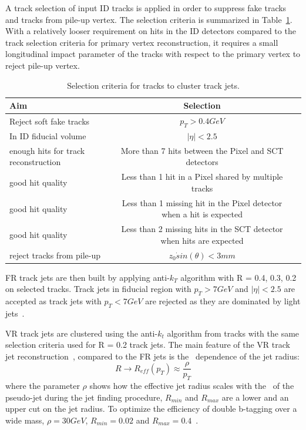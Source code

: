 \par A track selection of input ID tracks is applied in order to suppress fake tracks and tracks from pile-up vertex. The selection criteria is summarized in Table~\ref{tab:trk}. With a relatively looser requirement on hits in the ID detectors compared to the track selection criteria for primary vertex reconstruction, it requires a small longitudinal impact parameter of the tracks with respect to the primary vertex to reject pile-up vertex.
\begin{table}	
\centering

    \scriptsize
\begin{tabular}{|l|c|c}
\hline
Aim & Selection \\					
\hline
Reject soft fake tracks &$p_T> 0.4 GeV$ \\
\hline
In ID fiducial volume &$|\eta| < 2.5$\\
\hline 
enough hits for track reconstruction & More than 7 hits between the Pixel and SCT detectors \\
\hline 
 good hit quality& Less than 1 hit in a Pixel shared by multiple tracks\\
\hline
 good hit quality&Less than 1 missing hit in the Pixel detector when a hit is expected\\
\hline 
good hit quality&Less than 2 missing hits in the SCT detector when hits are expected\\
 \hline
reject tracks from pile-up & $z_0 \dot sin(\theta) < 3 mm$\\
 \hline
\end{tabular}
\caption{Selection criteria for tracks to cluster track jets. }
\label{tab:trk}
\end{table}	
\par FR track jets are then built by applying anti-$k_T$ algorithm with R = {0.4, 0.3, 0.2} on selected tracks. Track jets in fiducial region with $p_T > 7 GeV$ and $|\eta| < 2.5$ are accepted as track jets with $p_T < 7 GeV$ are rejected as they are dominated by light jets~\cite{ATL-PHYS-PUB-2014-013}. 				
\par VR track jets are clustered using the anti-$k_t$ algorithm from tracks with the same selection criteria used for R = 0.2 track jets. The main feature of the VR track jet reconstruction~\cite{Krohn:2009zg}, compared to the FR jets is the \pt~dependence of the jet radius:
\begin{equation}
R \rightarrow R_{eff}(p_T) \approx \frac{\rho}{p_T}
\end{equation}
where the parameter $\rho$ shows how the effective jet radius scales with the \pt~of the pseudo-jet during the jet finding procedure, $R_{min}$ and $R_{max}$ are a lower and an upper cut on the jet radius.
To optimize the efficiency of double b-tagging over a wide mass, $ \rho = 30 GeV$, $R_{min} = 0.02$ and $R_{max} = 0.4$~\cite{ATL-PHYS-PUB-2017-010}.

